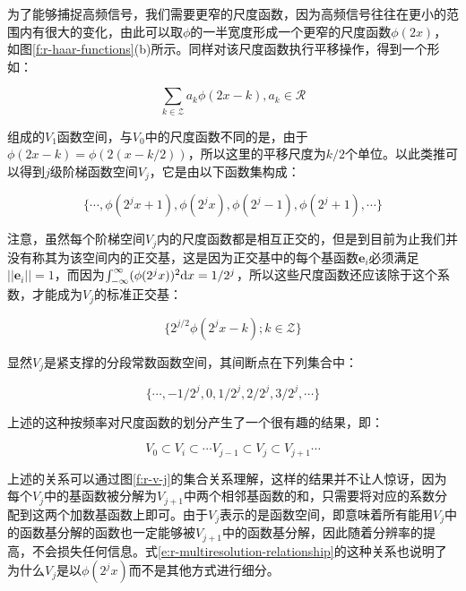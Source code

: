 为了能够捕捉高频信号，我们需要更窄的尺度函数，因为高频信号往往在更小的范围内有很大的变化，由此可以取$\phi$的一半宽度形成一个更窄的尺度函数$\phi(2x)$，如图\ref{f:r-haar-functions}(b)所示。同样对该尺度函数执行平移操作，得到一个形如：

\begin{equation}
	\sum_{k\in \mathcal{Z}}a_k\phi(2x-k),a_k\in \mathcal{R}
\end{equation}

\noindent 组成的$V_1$函数空间，与$V_0$中的尺度函数不同的是，由于$\phi(2x-k)=\phi(2(x-k/2))$，所以这里的平移尺度为$k/2$个单位。以此类推可以得到$j$级阶梯函数空间$V_j$，它是由以下函数集构成：

\begin{equation}
	\{\cdots,\phi(2^{j}x+1),\phi(2^{j}x),\phi(2^{j}-1),\phi(2^{j}+1),\cdots\}
\end{equation}

\noindent 注意，虽然每个阶梯空间$V_j$内的尺度函数都是相互正交的，但是到目前为止我们并没有称其为该空间内的正交基，这是因为正交基中的每个基函数$\mathbf{e}_i$必须满足$||\mathbf{e}_i||=1$，而因为$\int^{\infty}_{-\infty}(\phi(2^{j}x))^{2}{\rm d}x=1/2^{j}$，所以这些尺度函数还应该除于这个系数，才能成为$V_j$的标准正交基：

\begin{equation}
	\{2^{j/2}\phi(2^{j}x-k);k\in\mathcal{Z}\}
\end{equation}

\noindent 显然$V_j$是紧支撑的分段常数函数空间，其间断点在下列集合中：

\begin{equation}
	\{\cdots,-1/2^{j},0,1/2^{j},2/2^{j},3/2^{j},\cdots\}
\end{equation}

\noindent 上述的这种按频率对尺度函数的划分产生了一个很有趣的结果，即：

\begin{equation}\label{e:r-multiresolution-relationship}
	V_0\subset V_i\subset\cdots V_{j-1}\subset V_j\subset V_{j+1}\cdots
\end{equation}

\noindent 上述的关系可以通过图\ref{f:r-v-j}的集合关系理解，这样的结果并不让人惊讶，因为每个$V_j$中的基函数被分解为$V_{j+1}$中两个相邻基函数的和，只需要将对应的系数分配到这两个加数基函数上即可。由于$V_j$表示的是函数空间，即意味着所有能用$V_j$中的函数基分解的函数也一定能够被$V_{j+1}$中的函数基分解，因此随着分辨率的提高，不会损失任何信息。式\ref{e:r-multiresolution-relationship}的这种关系也说明了为什么$V_j$是以$\phi(2^{j}x)$而不是其他方式进行细分。


